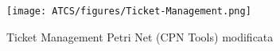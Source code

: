 \documentclass[../Relazione.tex]{subfiles}
\begin{document}
\begin{landscape}
    \begin{figure}[!htbp]
        \centering
        \texttt{[image: ATCS/figures/Ticket-Management.png]}
        \caption{Ticket Management Petri Net (CPN Tools) modificata}
        \label{fig:CPN_net}
    \end{figure}
\end{landscape}
    
\end{document}
